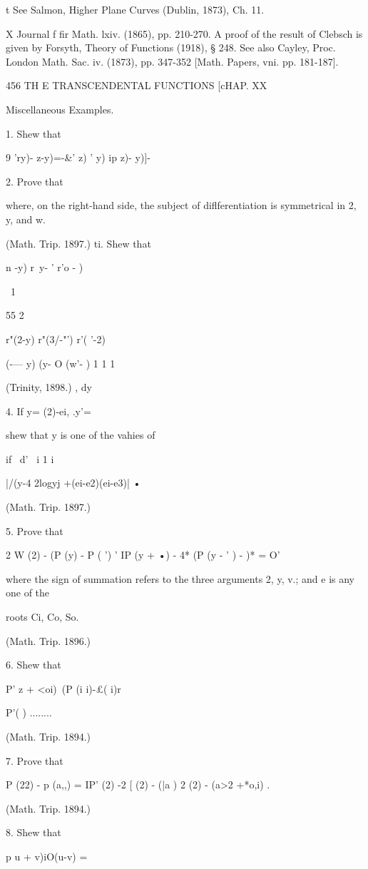 {t See Salmon, Higher Plane Curves (Dublin, 1873), Ch. 11.

X Journal f fir Math. lxiv. (1865), pp. 210-270. A proof of the result
of Clebsch is given by Forsyth, Theory of Functions (1918), § 248. See
also Cayley, Proc. London Math. Sac. iv. (1873), pp. 347-352 [Math.
Papers, vni. pp. 181-187].

456 TH E TRANSCENDENTAL FUNCTIONS [cHAP. XX

Miscellaneous Examples.

1. Shew that

9 'ry)- z-y)=-\&' z) ' y) ip z)- y)]-\

2. Prove that

where, on the right-hand side, the subject of diflferentiation is
symmetrical in 2, y, and w.

(Math. Trip. 1897.) ti. Shew that

n -y) r\ y- ' r'o - )

\ 1

55 2

r"(2-y) r"(3/-"') r'( '-2)

  (-— y) (y- O (w'- ) 1 1 1

(Trinity, 1898.) , dy

4. If y= (2)-ei, .y'=

shew that y is one of the vahies of

if \ d' \ i 1 i

|/(y-4 2logyj +(ei-e2)(ei-e3)| •

(Math. Trip. 1897.)

5. Prove that

2 W (2) - (P (y) - P ( ') ' IP (y + •) - 4* (P (y - ' ) - )* = O'

where the sign of summation refers to the three arguments 2, y, v.;
and e is any one of the

roots Ci, Co, So.

(Math. Trip. 1896.)

6. Shew that

P' z + <oi)\ (P (i i)-£( i)r

P'( ) ........

(Math. Trip. 1894.)

7. Prove that

P (22) - p (a,,) = IP' (2) -2 [ (2) - (|a ) 2 (2) - (a>2 +*o,i) .

(Math. Trip. 1894.)

8. Shew that

p u + v)iO(u-v) =

}
